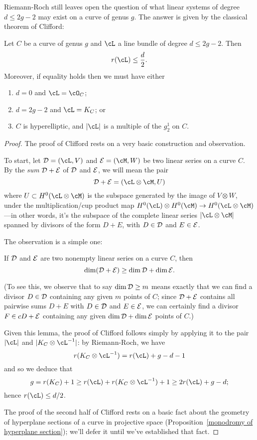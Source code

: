 Riemann-Roch still leaves open the question of what linear systems of degree $d \leq 2g-2$ may exist on a curve of genus $g$. The answer is given by the classical theorem of Clifford:

\begin{theorem}\label{Clifford}
Let $C$ be a curve of genus $g$ and $\cL$ a line bundle of degree $d \leq 2g-2$. Then
$$
r(\cL) \leq \frac{d}{2}.
$$
Moreover, if  equality holds then we must have either
\begin{enumerate}
\item $d=0$ and $\cL = \cO_C$;
\item $d = 2g-2$ and $\cL = K_C$; or
\item $C$ is hyperelliptic, and $|\cL|$ is a multiple of the $g^1_2$ on $C$.
\end{enumerate}
\end{theorem}

\begin{proof}
The proof of Clifford rests on a very basic construction and observation. 

To start, let $\cD = (\cL,V)$ and $\cE = (\cM, W)$ be two linear series on a curve $C$. By the \emph{sum} $\cD + \cE$ of $\cD$ and $\cE$, we will mean the pair 
$$
\cD + \cE = (\cL \otimes \cM, U) 
$$
where $U \subset H^0(\cL \otimes \cM)$ is the subspace generated by the image of $V \otimes W$, under the multiplication/cup product map $H^0(\cL) \otimes H^0(\cM) \to H^0(\cL \otimes \cM)$---in other words, it's the subspace of the complete linear series $|\cL\otimes \cM|$ spanned by divisors of the form $D+E$, with $D \in \cD$ and $E \in \cE$.

The observation is a simple one:
\begin{lemma}
If $\cD$ and $\cE$ are two nonempty linear series on a curve $C$, then
$$
\dim(\cD + \cE) \geq \dim \cD + \dim \cE.
$$
\end{lemma}
(To see this, we observe that to say $\dim \cD \geq m$ means exactly that we can find a divisor $D \in \cD$ containing any given $m$ points of $C$; since $\cD + \cE$ contains all pairwise sums $D + E$ with $D \in \cD$ and $E \in \cE$, we can certainly find a divisor $F \in cD + \cE$ containing any given $\dim \cD + \dim \cE$ points of $C$.)

Given this lemma, the proof of Clifford follows simply by applying it to the pair $|\cL|$ and $|K_C\otimes \cL^{-1}|$: by Riemann-Roch, we have
$$
r(K_C\otimes \cL^{-1}) = r(\cL) +g - d - 1
$$
and so we deduce that
$$
g = r(K_C) + 1 \geq r(\cL) + r(K_C\otimes \cL^{-1}) + 1 \geq 2r(\cL) +g - d;
$$
hence $r(\cL) \leq d/2$.

The proof of the second half of Clifford rests on a basic fact about the geometry of hyperplane sections of a curve in projective space (Proposition~\ref{monodromy of hyperplane section}); we'll defer it until we've established that fact.
\end{proof}

